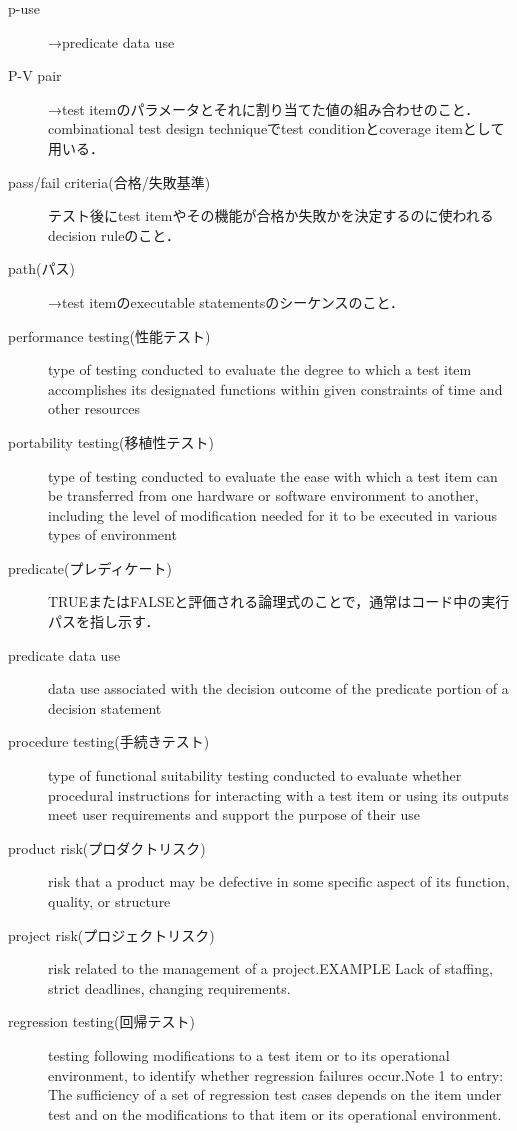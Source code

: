 \begin{description}
    \item[p-use]→predicate data use
    \item[P-V pair]→test itemのパラメータとそれに割り当てた値の組み合わせのこと．combinational test design techniqueでtest conditionとcoverage itemとして用いる．
    \item[pass/fail criteria(合格/失敗基準)]テスト後にtest itemやその機能が合格か失敗かを決定するのに使われるdecision ruleのこと．
    \item[path(パス)]→test itemのexecutable statementsのシーケンスのこと．
    \item[performance testing(性能テスト)]type of testing conducted to evaluate the degree to which a test item accomplishes its designated functions within given constraints of time and other resources
    \item[portability testing(移植性テスト)]type of testing conducted to evaluate the ease with which a test item can be transferred from one hardware or software environment to another, including the level of modification needed for it to be executed in various types of environment
    \item[predicate(プレディケート)]{\sf TRUE}または{\sf FALSE}と評価される論理式のことで，通常はコード中の実行パスを指し示す．
    \item[predicate data use]data use associated with the decision outcome of the predicate portion of a decision statement
    \item[procedure testing(手続きテスト)]type of functional suitability testing conducted to evaluate whether procedural instructions for interacting with a test item or using its outputs meet user requirements and support the purpose of their use
    \item[product risk(プロダクトリスク)]risk that a product may be defective in some specific aspect of its function, quality, or structure
    \item[project risk(プロジェクトリスク)]risk related to the management of a project.EXAMPLE Lack of staffing, strict deadlines, changing requirements.
    \item[regression testing(回帰テスト)]testing following modifications to a test item or to its operational environment, to identify whether regression failures occur.Note 1 to entry: The sufficiency of a set of regression test cases depends on the item under test and on the modifications to that item or its operational environment.

\end{description}
